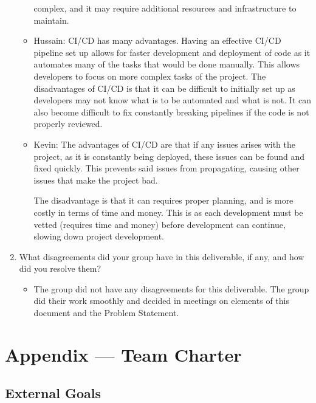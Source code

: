 \documentclass{article}
\begin{document}
\begin{enumerate}
\begin{itemize}
    complex, and it may require additional resources and infrastructure to 
    maintain.
		\item Hussain: CI/CD has many advantages. Having an effective CI/CD 
    pipeline set up allows for faster development and deployment of 
    code as it automates many of the tasks that would be done manually. 
    This allows developers to focus on more complex tasks of the project. 
    The disadvantages of CI/CD is that it can be difficult to 
    initially set up as developers may not know what is to be 
    automated and what is not. It can also become difficult 
    to fix constantly breaking pipelines if the 
    code is not properly reviewed.
		\item Kevin: The advantages of CI/CD are that if any issues arises with 
        the project, as it is constantly being deployed, these issues can be 
        found and fixed quickly. This prevents said issues from propagating, 
        causing other issues that make the project bad.
		
		The disadvantage is that it can requires proper planning, and is more 
        costly in terms of time and money. This is as each development must 
        be vetted (requires time and money) before development can continue, 
        slowing down project development. 

	\end{itemize}
    \item What disagreements did your group have in this deliverable, if any,
    and how did you resolve them?
    
   \begin{itemize}
		\item The group did not have any disagreements for this deliverable. 
        The group did their work smoothly and decided in meetings on elements 
        of this document and the Problem Statement.
	\end{itemize}
\end{enumerate}

\newpage{}

\section*{Appendix --- Team Charter}


\subsection*{External Goals}
\end{document}
